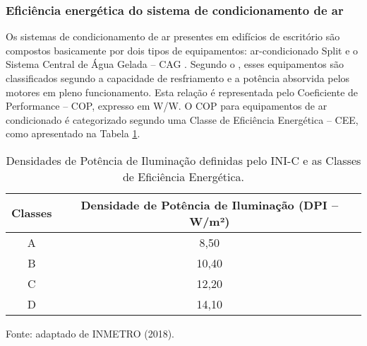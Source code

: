 \subsubsection{Eficiência energética do sistema de condicionamento de ar}
Os sistemas de condicionamento de ar presentes em edifícios de escritório são 
compostos basicamente por dois tipos de equipamentos: ar-condicionado Split e o 
Sistema Central de Água Gelada – CAG \cite{ConselhoBrasileirodeConstrucaoSustentavel-CBCS2015}.\vspace*{0.3cm} \newline
Segundo o \textcite{InstitutoNacionaldeMetrologiaNormalizacaoeQualidadeIndustrial-INMETRO2018}, esses equipamentos são classificados segundo a 
capacidade de resfriamento e a potência absorvida pelos motores em pleno 
funcionamento. Esta relação é representada pelo Coeficiente de Performance – COP, 
expresso em W/W. O COP para equipamentos de ar condicionado é categorizado 
segundo uma Classe de Eficiência Energética – CEE, como apresentado na Tabela \ref{tab:tabela6}.

\begin{table}[ht]\centering
    \caption{\small Densidades de Potência de Iluminação definidas pelo INI-C e as Classes de Eficiência Energética.}
    \vspace*{0.3cm}
    \label{tab:tabela6}
    \begin{tabular*}{\columnwidth}{@{\extracolsep{\fill}}cc}
        \hline
        \textbf{Classes}                & \textbf{Densidade de Potência de Iluminação (DPI – W/m²)}\\ \hline
        A                               & 8,50                                                     \\ \hline
        B                               & 10,40                                                    \\ \hline
        C                               & 12,20                                                    \\ \hline
        D                               & 14,10                                                    \\ \hline
    \end{tabular*}
    \begin{flushleft}
        \par \small Fonte: adaptado de INMETRO (2018).
    \end{flushleft}
\end{table}

